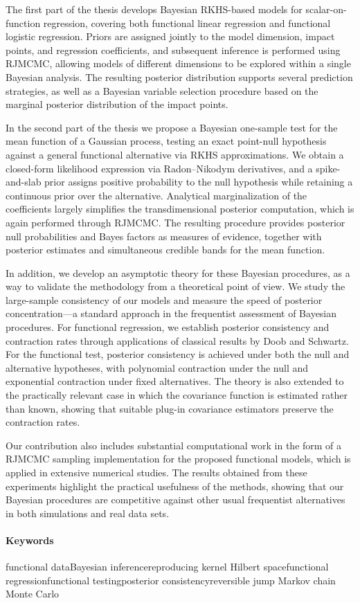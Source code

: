 The first part of the thesis develops Bayesian \acs{RKHS}-based models for scalar-on-function regression, covering both functional linear regression and functional logistic regression. Priors are assigned jointly to the model dimension, impact points, and regression coefficients, and subsequent inference is performed using \acs{RJMCMC}, allowing models of different dimensions to be explored within a single Bayesian analysis. The resulting posterior distribution supports several prediction strategies, as well as a Bayesian variable selection procedure based on the marginal posterior distribution of the impact points.

In the second part of the thesis we propose a Bayesian one-sample test for the mean function of a Gaussian process, testing an exact point-null hypothesis against a general functional alternative via \acs{RKHS} approximations. We obtain a closed-form likelihood expression via Radon--Nikodym derivatives, and a spike-and-slab prior assigns positive probability to the null hypothesis while retaining a continuous prior over the alternative. Analytical marginalization of the coefficients largely simplifies the transdimensional posterior computation, which is again performed through \acs{RJMCMC}. The resulting procedure provides posterior null probabilities and Bayes factors as measures of evidence, together with posterior estimates and simultaneous credible bands for the mean function.

In addition, we develop an asymptotic theory for these Bayesian procedures, as a way to validate the methodology from a theoretical point of view. We study the large-sample consistency of our models and measure the speed of posterior concentration---a standard approach in the frequentist assessment of Bayesian procedures. For functional regression, we establish posterior consistency and contraction rates through applications of classical results by Doob and Schwartz. For the functional test, posterior consistency is achieved under both the null and alternative hypotheses, with polynomial contraction under the null and exponential contraction under fixed alternatives. The theory is also extended to the practically relevant case in which the covariance function is estimated rather than known, showing that suitable plug-in covariance estimators preserve the contraction rates.

Our contribution also includes substantial computational work in the form of a \acs{RJMCMC} sampling implementation for the proposed functional models, which is applied in extensive numerical studies. The results obtained from these experiments highlight the practical usefulness of the methods, showing that our Bayesian procedures are competitive against other usual frequentist alternatives in both simulations and real data sets.


\paragraph{Keywords}
functional data\qquad Bayesian inference\qquad reproducing kernel Hilbert space\qquad functional regression\qquad functional testing\qquad posterior consistency\qquad reversible jump Markov chain Monte Carlo


\endgroup

